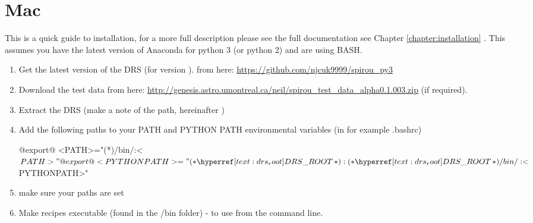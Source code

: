 \section{Mac}

\noindent This is a quick guide to installation, for a more full description please \ifquickguide see the full documentation \else see Chapter \ref{chapter:installation} \fi. This assumes you have the latest version of Anaconda for python 3 (or python 2) and are using BASH.


\begin{enumerate}

\item Get the latest version of the DRS (for \instrument version \MyCodeVersion). from here: \url{https://github.com/njcuk9999/spirou_py3}

\item Download the test data from here: \url{http://genesis.astro.umontreal.ca/neil/spirou_test_data_alpha0.1.003.zip} (if required).

\item Extract the DRS (make a note of the path, hereinafter \InstallDIR)

\item Add the following paths to your PATH and PYTHON PATH environmental variables (in for example .bashrc)

	\begin{bashbox}[title={e.g. in $\sim$/.bashrc}]
	@export@ <PATH>="(*\InstallDIR*)/bin/:<$PATH>"
	@export@ <PYTHONPATH>="(*\InstallDIR*):(*\InstallDIR*)/bin/:<$PYTHONPATH>"
	\end{bashbox}

\item make sure your paths are set

\item Make recipes executable (found in the \InstallDIR/bin folder) - to use from the command line.


\end{enumerate}
